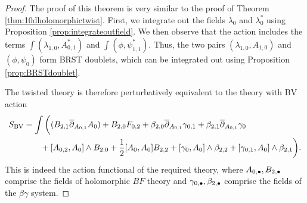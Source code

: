 \documentclass[10pt, oneside]{article}
\begin{document}
\begin{proof}
The proof of this theorem is very similar to the proof of Theorem \ref{thm:10dholomorphictwist}.  
First, we integrate out the fields $\lambda_0$ and $\lambda_0^*$ using Proposition \ref{prop:integrateoutfield}.  
We then observe that the action includes the terms $\int  (\lambda_{1,0} , A_{0,1}^*)$ and  $\int (\phi, \psi_{1,1}^*)$.  
Thus, the two pairs $(\lambda_{1,0}, A_{1,0})$ and $(\phi, \psi_0)$ form BRST doublets, 
which can be integrated out using Proposition \ref{prop:BRSTdoublet}.  

The twisted theory is therefore perturbatively equivalent to the theory with BV action 
\begin{align*}
 S_{\mathrm{BV}} &= \int \bigg( (B_{2,1} \overline{\partial}_{A_{0,1}} A_{0})  + B_{2,0} F_{0,2} + \beta_{2,0} \overline{\partial}_{A_{0,1}} \gamma_{0,1} + \beta_{2,1} \overline{\partial}_{A_{0,1}} \gamma_0 \\ 
  &\qquad  + [A_{0,2}, A_0]\wedge B_{2,0} + \frac{1}{2}[A_0, A_0]B_{2,2} +  [\gamma_0, A_0]\wedge \beta_{2,2} + [\gamma_{0,1}, A_0]\wedge \beta_{2,1}  \bigg).
\end{align*}
This is indeed the action functional of the required theory, where $A_{0,\bullet}, B_{2,\bullet}$ comprise the fields of holomorphic $BF$ theory and $\gamma_{0,\bullet}, \beta_{2,\bullet}$ comprise the fields of the $\beta\gamma$ system.
\end{proof}
\end{document}
